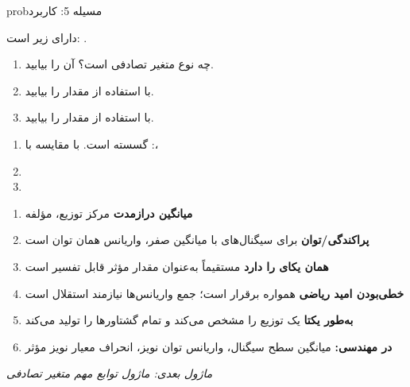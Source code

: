 \begin{PSbox}[unbreakable]{prob}{مسیله 5: کاربرد }

 دارای  زیر است: .

\begin{enumerate}
\def\labelenumi{(\alph{enumi})}
\tightlist
\item
   چه نوع متغیر تصادفی است؟  آن را بیابید.
\item
  با استفاده از  مقدار  را بیابید.
\item
  با استفاده از  مقدار  را بیابید.
\end{enumerate}

\PSsolution{} 

\begin{enumerate}
\def\labelenumi{(\alph{enumi})}
\item
   گسسته است. با مقایسه با :\PSbr{}، 
\item
  \PSbr{}
\item
  \PSbr{}
\end{enumerate}

\end{PSbox}


\begin{enumerate}
\def\labelenumi{\arabic{enumi}.}
\tightlist
\item
  \textbf{ میانگین درازمدت}  مرکز توزیع، مؤلفه 
\item
  \textbf{ پراکندگی/توان}  برای سیگنال‌های با میانگین صفر، واریانس همان توان است
\item
  \textbf{\lr{\ensuremath{\sigma}} همان یکای  را دارد}  مستقیماً به‌عنوان مقدار مؤثر  قابل تفسیر است
\item
  \textbf{خطی‌بودن امید ریاضی} همواره برقرار است؛ جمع واریانس‌ها نیازمند استقلال است
\item
  \textbf{ به‌طور یکتا} یک توزیع را مشخص می‌کند و تمام گشتاورها را تولید می‌کند
\item
  \textbf{در مهندسی:} میانگین \lr{\ensuremath{\to}} سطح سیگنال، واریانس \lr{\ensuremath{\to}} توان نویز، انحراف معیار \lr{\ensuremath{\to}} نویز مؤثر
\end{enumerate}

\emph{ماژول بعدی: {ماژول  توابع مهم متغیر تصادفی}}\PSbr{}
